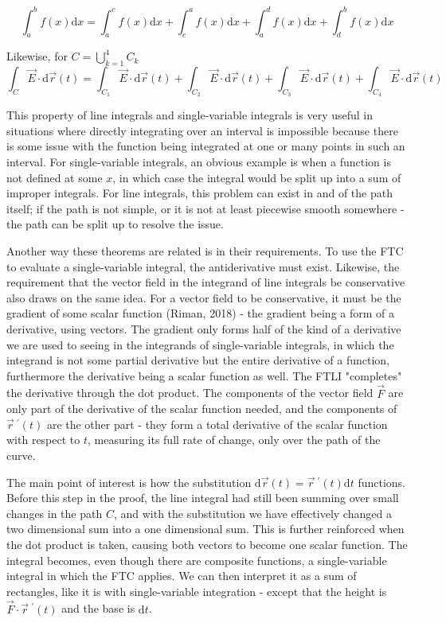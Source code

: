 \documentclass[11pt]{article}
\newcommand{\dr}{\vec{r}~^{\prime}(t)}
\begin{document}
$$\int_a^b f(x)\mathrm{d}x = \int_a^c f(x)\mathrm{d}x +\int_c^a f(x)\mathrm{d}x +\int_a^d f(x)\mathrm{d}x +\int_d^b f(x)\mathrm{d}x$$

Likewise, for $\displaystyle{C=\bigcup_{k=1}^4 C_k}$
$$\int_C \vec{E}\cdot\mathrm{d}\vec{r}(t)=\int_{C_1}\vec{E}\cdot\mathrm{d}\vec{r}(t)+\int_{C_2}\vec{E}\cdot\mathrm{d}\vec{r}(t)+\int_{C_3}\vec{E}\cdot\mathrm{d}\vec{r}(t)+\int_{C_4}\vec{E}\cdot\mathrm{d}\vec{r}(t)$$

This property of line integrals and single-variable integrals is very useful in situations where directly integrating over an interval is impossible because there is some issue with the function being integrated at one or many points in such an interval. For single-variable integrals, an obvious example is when a function is not defined at some $x$, in which case the integral would be split up into a sum of improper integrals. For line integrals, this problem can exist in and of the path itself; if the path is not simple, or it is not at least piecewise smooth somewhere - the path can be split up to resolve the issue.

Another way these theorems are related is in their requirements. To use the FTC to evaluate a single-variable integral, the antiderivative must exist. Likewise, the requirement that the vector field in the integrand of line integrals be conservative also draws on the same idea. For a vector field to be conservative, it must be the gradient of some scalar function (Riman, 2018) - the gradient being a form of a derivative, using vectors. The gradient only forms half of the kind of a derivative we are used to seeing in the integrands of single-variable integrals, in which the integrand is not some partial derivative but the entire derivative of a function, furthermore the derivative being a scalar function as well. The FTLI "completes" the derivative through the dot product. The components of the vector field $\vec{F}$ are only part of the derivative of the scalar function needed, and the components of $\dr$ are the other part - they form a total derivative of the scalar function with respect to $t$, measuring its full rate of change, only over the path of the curve.

The main point of interest is how the substitution $\mathrm{d}\vec{r}(t)=\dr\mathrm{d}t$ functions. Before this step in the proof, the line integral had still been summing over small changes in the path $C$, and with the substitution we have effectively changed a two dimensional sum into a one dimensional sum. This is further reinforced when the dot product is taken, causing both vectors to become one scalar function. The integral becomes, even though there are composite functions, a single-variable integral in which the FTC applies. We can then interpret it as a sum of rectangles, like it is with single-variable integration - except that the height is $\vec{F}\cdot\dr$ and the base is $\mathrm{d}t$.
\end{document}
